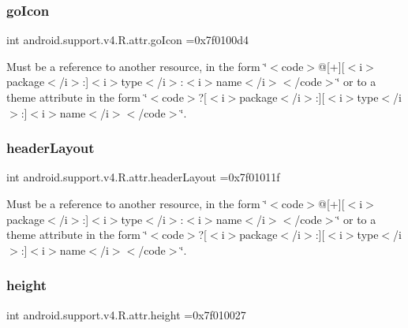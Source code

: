 \subsubsection{\texorpdfstring{go\+Icon}{goIcon}}
{\footnotesize\ttfamily int android.\+support.\+v4.\+R.\+attr.\+go\+Icon =0x7f0100d4\hspace{0.3cm}{\ttfamily [static]}}

Must be a reference to another resource, in the form \char`\"{}$<$code$>$@\mbox{[}+\mbox{]}\mbox{[}$<$i$>$package$<$/i$>$\+:\mbox{]}$<$i$>$type$<$/i$>$\+:$<$i$>$name$<$/i$>$$<$/code$>$\char`\"{} or to a theme attribute in the form \char`\"{}$<$code$>$?\mbox{[}$<$i$>$package$<$/i$>$\+:\mbox{]}\mbox{[}$<$i$>$type$<$/i$>$\+:\mbox{]}$<$i$>$name$<$/i$>$$<$/code$>$\char`\"{}. \mbox{\label{classandroid_1_1support_1_1v4_1_1R_1_1attr_a3832cf62beb2ee9abc9cf44e6d387519}} 
\subsubsection{\texorpdfstring{header\+Layout}{headerLayout}}
{\footnotesize\ttfamily int android.\+support.\+v4.\+R.\+attr.\+header\+Layout =0x7f01011f\hspace{0.3cm}{\ttfamily [static]}}

Must be a reference to another resource, in the form \char`\"{}$<$code$>$@\mbox{[}+\mbox{]}\mbox{[}$<$i$>$package$<$/i$>$\+:\mbox{]}$<$i$>$type$<$/i$>$\+:$<$i$>$name$<$/i$>$$<$/code$>$\char`\"{} or to a theme attribute in the form \char`\"{}$<$code$>$?\mbox{[}$<$i$>$package$<$/i$>$\+:\mbox{]}\mbox{[}$<$i$>$type$<$/i$>$\+:\mbox{]}$<$i$>$name$<$/i$>$$<$/code$>$\char`\"{}. \mbox{\label{classandroid_1_1support_1_1v4_1_1R_1_1attr_a991d4e3217e3aec7fcb237693e406b04}} 
\subsubsection{\texorpdfstring{height}{height}}
{\footnotesize\ttfamily int android.\+support.\+v4.\+R.\+attr.\+height =0x7f010027\hspace{0.3cm}{\ttfamily [static]}}

